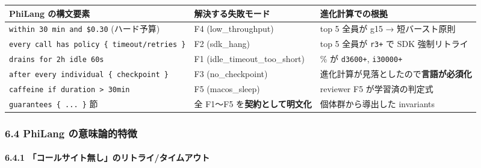 \documentclass[
]{ltjsarticle}
\newcounter{none} %
\begin{document}
{\def\LTcaptype{none} %
\begin{longtable}[]{@{}
  >{\raggedright\arraybackslash}p{}
  >{\raggedright\arraybackslash}p{}
  >{\raggedright\arraybackslash}p{}@{}}
\toprule\noalign{}
\begin{minipage}[b]{\linewidth}\raggedright
PhiLang の構文要素
\end{minipage} & \begin{minipage}[b]{\linewidth}\raggedright
解決する失敗モード
\end{minipage} & \begin{minipage}[b]{\linewidth}\raggedright
進化計算での根拠
\end{minipage} \\
\midrule\noalign{}
\endhead
\bottomrule\noalign{}
\endlastfoot
\texttt{within\ 30\ min\ and\ \$0.30} (ハード予算) & F4
(low\_throughput) & top 5 全員が g15 → 短バースト原則 \\
\texttt{every\ call\ has\ policy\ \{\ timeout/retries\ \}} & F2
(sdk\_hang) & top 5 全員が \texttt{r3+} で SDK 強制リトライ \\
\texttt{drains\ for\ 2h\ idle\ 60s} & F1 (idle\_timeout\_too\_short) &
80\% が \texttt{d3600+}, \texttt{i30000+} \\
\texttt{after\ every\ individual\ \{\ checkpoint\ \}} & F3
(no\_checkpoint) & 進化計算が見落としたので\textbf{言語が必須化} \\
\texttt{caffeine\ if\ duration\ \textgreater{}\ 30min} & F5
(macos\_sleep) & reviewer F5 が学習済の判定式 \\
\texttt{guarantees\ \{\ ...\ \}} 節 & 全 F1〜F5
を\textbf{契約として明文化} & 個体群から導出した invariants \\
\end{longtable}
}

\subsubsection{6.4 PhiLang
の意味論的特徴}\label{philang-ux306eux610fux5473ux8ad6ux7684ux7279ux5fb4}

\paragraph{6.4.1
「コールサイト無し」のリトライ/タイムアウト}\label{ux30b3ux30fcux30ebux30b5ux30a4ux30c8ux7121ux3057ux306eux30eaux30c8ux30e9ux30a4ux30bfux30a4ux30e0ux30a2ux30a6ux30c8}
\end{document}
